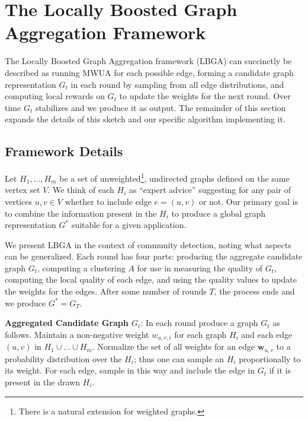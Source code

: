 \documentclass{article}
\begin{document}


\section{The Locally Boosted Graph Aggregation Framework}
\label{sec:lbga}

The Locally Boosted Graph Aggregation framework (LBGA) can succinctly be
described as running MWUA for each possible edge, forming a candidate graph
representation $G_t$ in each round by sampling from all edge distributions, and
computing local rewards on $G_t$ to update the weights for the next round. Over
time $G_t$ stabilizes and we produce it as output. The remainder of this
section expands the details of this sketch and our specific algorithm
implementing it.  

\subsection{Framework Details}
\label{sec:framework}

Let $H_1, \dots, H_m$ be a set of unweighted\footnote{There is a
natural extension for weighted graphs.}, undirected graphs defined on the same vertex set
$V$. We think of each $H_i$ as ``expert advice'' suggesting for any pair of
vertices $u,v \in V$ whether to include edge $e=(u,v)$ or not.  Our primary
goal is to combine the information present in the $H_i$ to produce a global
graph representation $G^*$ suitable for a given application. 

We present LBGA in the context of community detection, noting what aspects can
be generalized. Each round has four parts: producing the aggregate candidate
graph $G_t$, computing a clustering $A$ for use in measuring the quality of
$G_t$, computing the local quality of each edge, and using the quality values
to update the weights for the edges. After some number of rounds $T$, the
process ends and we produce $G^* = G_T$.

\textbf{Aggregated Candidate Graph $G_t$}: In each round produce a graph $G_t$
as follows. Maintain a non-negative weight $w_{u,v,i}$ for each graph $H_i$ and
each edge $(u,v)$ in $H_1 \cup \dots \cup H_m$. Normalize the set of all
weights for an edge $\mathbf{w}_{u,v}$ to a probability distribution over the
$H_i$; thus one can sample an $H_i$ proportionally to its weight. For each
edge, sample in this way and include the edge in $G_t$ if it is present in the
drawn $H_i$. 
\end{document}
